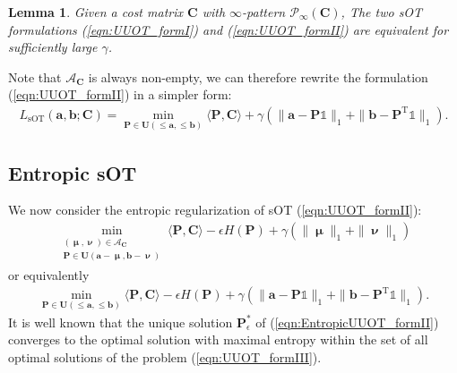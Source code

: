\documentclass[11pt]{book}
\newtheorem{lemma}[theorem]{Lemma}
\begin{document}
\begin{lemma}\label{lemma:equivalence}
    Given a cost matrix $\mathbf{C}$ with $\infty$-pattern $\mathcal{P}_{\infty}(\mathbf{C})$, The two sOT formulations (\ref{eqn:UUOT_formI}) and (\ref{eqn:UUOT_formII}) are equivalent for sufficiently large $\gamma$.
\end{lemma}

Note that $\mathcal{A}_{\mathbf{C}}$ is always non-empty, we can therefore rewrite the formulation (\ref{eqn:UUOT_formII}) in a simpler form:
\begin{align}\label{eqn:UUOT_formIII}
    L_{\text{sOT}}(\mathbf{a},\mathbf{b};\mathbf{C}) = \min_{\mathbf{P}\in \mathbf{U}(\le \mathbf{a},\le \mathbf{b})} \langle \mathbf{P}, \mathbf{C} \rangle + \gamma(\|\mathbf{a}-\mathbf{P}\mathbb{1}\|_1 + \|\mathbf{b}-\mathbf{P}^{\mathrm{T}}\mathbb{1}\|_1).
\end{align}




\subsection{Entropic sOT}



We now consider the entropic regularization of sOT (\ref{eqn:UUOT_formII}):
\begin{align}\label{eqn:EntropicUUOT_formI}
\min_{\substack{(\boldsymbol\upmu,\boldsymbol\upnu)\in\mathcal{A}_{\textbf{C}}\\ \textbf{P}\in \mathbf{U}(\textbf{a}-\boldsymbol\upmu,\textbf{b}-\boldsymbol\upnu)}} \langle \textbf{P}, \textbf{C} \rangle - \epsilon  H(\textbf{P}) + \gamma(\|\boldsymbol\upmu\|_1 + \|\boldsymbol\upnu\|_1) 
\end{align}
or equivalently 
\begin{align}\label{eqn:EntropicUUOT_formII}
\min_{\textbf{P} \in \mathbf{U}(\le \textbf{a}, \le \textbf{b})} \langle \textbf{P}, \textbf{C} \rangle - \epsilon H(\textbf{P}) + \gamma(\|\textbf{a} - \textbf{P}\mathbb{1} \|_1 + \|\textbf{b} - \textbf{P}^{\mathrm{T}}\mathbb{1} \|_1) .
\end{align}
It is well known that the unique solution $\textbf{P}_{\epsilon}^*$ of (\ref{eqn:EntropicUUOT_formII}) converges to the optimal solution with maximal entropy within the set of all optimal solutions of the problem (\ref{eqn:UUOT_formIII}). 
\end{document}
